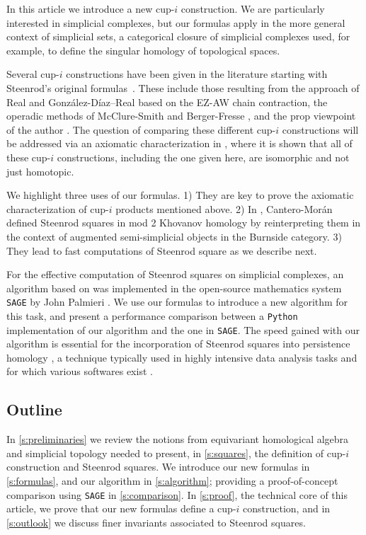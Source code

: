 In this article we introduce a new cup-$i$ construction.
We are particularly interested in simplicial complexes, but our formulas apply in the more general context of simplicial sets, a categorical closure of simplicial complexes used, for example, to define the singular homology of topological spaces.

Several cup-$i$ constructions have been given in the literature starting with Steenrod's original formulas~\cite{steenrod1947products}.
These include those resulting from the approach of Real \cite{real1996computability} and Gonz\'alez-D\'iaz--Real \cite{gonzalez-diaz1999steenrod, gonzalez2003computation, gonzalez-diaz2005cocyclic} based on the EZ-AW chain contraction, the operadic methods of McClure-Smith \cite{mcclure2003multivariable} and Berger-Fresse \cite{berger2004combinatorial}, and the prop viewpoint of the author \cite{medina2020prop1, medina2018prop2}.
The question of comparing these different cup-$i$ constructions will be addressed via an axiomatic characterization in \cite{medina2018axiomatic}, where it is shown that all of these cup-$i$ constructions, including the one given here, are isomorphic and not just homotopic.

We highlight three uses of our formulas.
1) They are key to prove the axiomatic characterization of cup-$i$ products mentioned above.
2) In \cite{cantero2020khovanov}, Cantero-Mor\'an defined Steenrod squares in mod 2 Khovanov homology \cite{khovanov2000categorification} by reinterpreting them in the context of augmented semi-simplicial objects in the Burnside category.
3) They lead to fast computations of Steenrod square as we describe next.

For the effective computation of Steenrod squares on simplicial complexes, an algorithm based on \cite{gonzalez-diaz1999steenrod} was implemented in the open-source mathematics system \verb|SAGE| by John Palmieri \cite{sagemath}.
We use our formulas to introduce a new algorithm for this task, and present a performance comparison between a \verb|Python| implementation of our algorithm and the one in \verb|SAGE|.
The speed gained with our algorithm is essential for the incorporation of Steenrod squares into persistence homology \cite{medina2018persistence}, a technique typically used in highly intensive data analysis tasks \cite{carlsson2008images, carlsson2013viral, lee2018nanoporous} and for which various softwares exist \cite{bauer2019ripser, gudhi, medina2021giotto}.

\subsection*{Outline}

In \cref{s:preliminaries} we review the notions from equivariant homological algebra and simplicial topology needed to present, in \cref{s:squares}, the definition of cup-$i$ construction and Steenrod squares.
We introduce our new formulas in \cref{s:formulas}, and our algorithm in \cref{s:algorithm}; providing a proof-of-concept comparison using \verb|SAGE| in \cref{s:comparison}.
In \cref{s:proof}, the technical core of this article, we prove that our new formulas define a cup-$i$ construction, and in \cref{s:outlook} we discuss finer invariants associated to Steenrod squares.